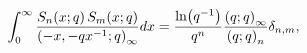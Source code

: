 \[\int_{0}^{\infty}\frac{\mathop{S_{n}\/}\nolimits\!\left(x;q\right)\mathop{S_{m%
}\/}\nolimits\!\left(x;q\right)}{\left(-x,-qx^{-1};q\right)_{\infty}}dx=\frac{%
\mathop{\ln\/}\nolimits\!\left(q^{-1}\right)}{q^{n}}\frac{\left(q;q\right)_{%
\infty}}{\left(q;q\right)_{n}}\delta_{n,m},\]